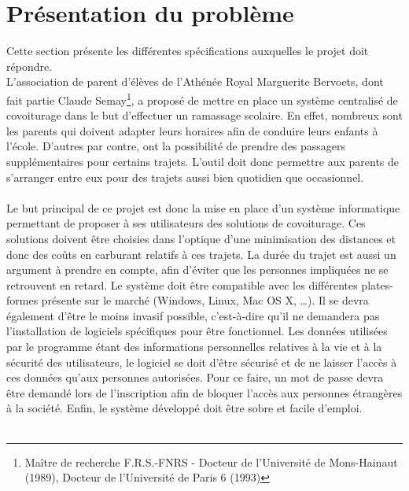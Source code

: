 \documentclass[12pt, a4paper, oneside]{article}
\begin{document}
\section{Présentation du problème}\label{prob}
    Cette section présente les différentes spécifications auxquelles le projet doit répondre.\\
    \indent L'association de parent d'élèves de l'Athénée Royal Marguerite Bervoets, dont fait partie Claude Semay\footnote{Maître de recherche F.R.S.-FNRS - Docteur de l'Université de Mons-Hainaut (1989), Docteur de l'Université de Paris 6 (1993)}, a proposé de mettre en place un système centralisé de covoiturage dans le but d'effectuer un ramassage scolaire. En effet, nombreux sont les parents qui doivent adapter leurs horaires afin de conduire leurs enfants à l'école. D'autres par contre, ont la possibilité de prendre des passagers supplémentaires pour certains trajets. L'outil doit donc permettre aux parents de s'arranger entre eux pour des trajets aussi bien quotidien que occasionnel.\\\\
    \indent Le but principal de ce projet est donc la mise en place d'un système informatique permettant de proposer à ses utilisateurs des solutions de covoiturage. Ces solutions doivent être choisies dans l'optique d'une minimisation des distances et donc des coûts en carburant relatifs à ces trajets. La durée du trajet est aussi un argument à prendre en compte, afin d'éviter que les personnes impliquées ne se retrouvent en retard. Le système doit être compatible avec les différentes plates-formes présente sur le marché (Windows, Linux, Mac OS X, \dots). Il se devra également d'être le moins invasif possible, c'est-à-dire qu'il ne demandera pas l'installation de logiciels spécifiques pour être fonctionnel. Les données utilisées par le programme étant des informations personnelles relatives à la vie et à la sécurité des utilisateurs, le logiciel se doit d'être sécurisé et de ne laisser l'accès à ces données qu'aux personnes autorisées. Pour ce faire, un mot de passe devra être demandé lors de l'inscription afin de bloquer l'accès aux personnes étrangères à la société. Enfin, le système développé doit être sobre et facile d'emploi.\\\\
\end{document}
